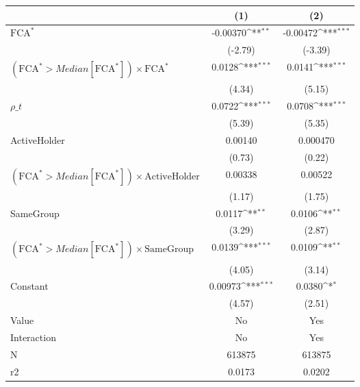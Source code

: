 {
\def\sym#1{\ifmmode^{#1}\else\(^{#1}\)\fi}
\begin{tabular}{l*{2}{c}}
\hline\hline
                    &\multicolumn{1}{c}{(1)}         &\multicolumn{1}{c}{(2)}         \\
\hline
$ \text{FCA}^* $    &    -0.00370\sym{**} &    -0.00472\sym{***}\\
                    &     (-2.79)         &     (-3.39)         \\
[1em]
 $ (\text{FCA}^* > Median[\text{FCA}^*]) \times {\text{FCA} ^*}  $ &      0.0128\sym{***}&      0.0141\sym{***}\\
                    &      (4.34)         &      (5.15)         \\
[1em]
$ \rho\_t $          &      0.0722\sym{***}&      0.0708\sym{***}\\
                    &      (5.39)         &      (5.35)         \\
[1em]
ActiveHolder        &     0.00140         &    0.000470         \\
                    &      (0.73)         &      (0.22)         \\
[1em]
 $ (\text{FCA}^* > Median[\text{FCA}^*]) \times {\text{ActiveHolder} }  $ &     0.00338         &     0.00522         \\
                    &      (1.17)         &      (1.75)         \\
[1em]
SameGroup           &      0.0117\sym{**} &      0.0106\sym{**} \\
                    &      (3.29)         &      (2.87)         \\
[1em]
 $ (\text{FCA}^* > Median[\text{FCA}^*]) \times {\text{SameGroup} }  $ &      0.0139\sym{***}&      0.0109\sym{**} \\
                    &      (4.05)         &      (3.14)         \\
[1em]
Constant            &     0.00973\sym{***}&      0.0380\sym{*}  \\
                    &      (4.57)         &      (2.51)         \\
\hline
Value               &          No         &         Yes         \\
Interaction         &          No         &         Yes         \\
N                   &      613875         &      613875         \\
r2                  &      0.0173         &      0.0202         \\

\end{tabular}}
